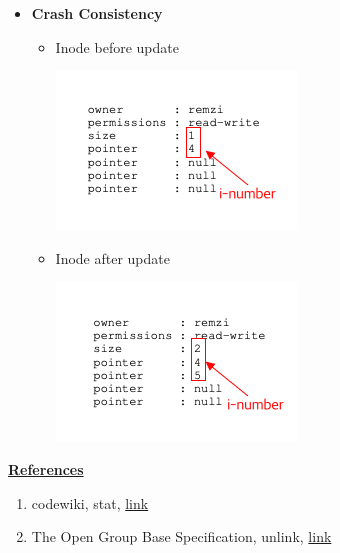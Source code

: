 \documentclass[12pt]{article}
\begin{document}
\begin{enumerate}[1.]
\begin{enumerate}
\begin{itemize}
            \item \textbf{Crash Consistency}

            \begin{itemize}
                \item Inode before update

                \begin{center}
                \includegraphics[width=0.6\linewidth]{../images/midterm_4_solution_26.png}
                \end{center}

                \item Inode after update

                \begin{center}
                \includegraphics[width=0.6\linewidth]{../images/midterm_4_solution_27.png}
                \end{center}
            \end{itemize}
        \end{itemize}

        \bigskip

        \underline{\textbf{References}}

        \begin{enumerate}[1)]
            \item codewiki, stat, \href{http://codewiki.wikidot.com/c:system-calls:stat}{link}
            \item The Open Group Base Specification, unlink, \href{https://pubs.opengroup.org/onlinepubs/009695399/functions/unlink.html}{link}
        \end{enumerate}
    \end{enumerate}


\end{enumerate}
\end{document}

